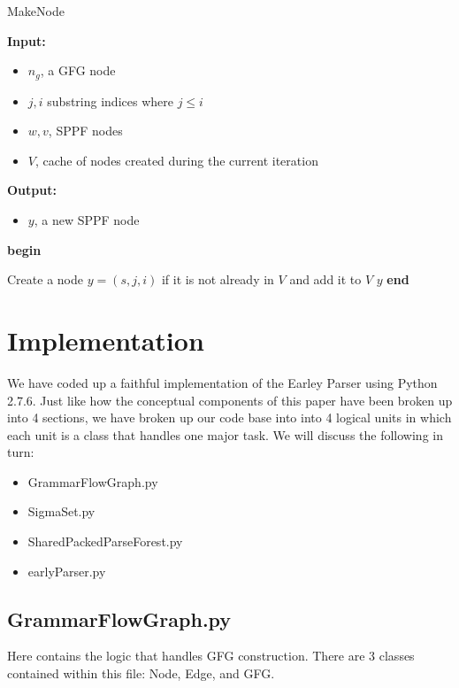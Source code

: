 \documentclass{sigplanconf}
\begin{document}
\begin{algorithm}[!h]\label{alg:MN}
	\caption{MakeNode}
	\textbf{Input:} 
	\begin{itemize}
	\item[] $n_g$, a GFG node
	\item[] $j,i$ substring indices where $j\leq{i}$
	\item[] $w,v$, SPPF nodes
	\item[] $V$, cache of nodes created during the current iteration
	\end{itemize}
	\textbf{Output:} 
	\begin{itemize}
	\item[] $y$, a new SPPF node
	\end{itemize}
	\textbf{begin}
	
	{
	Create a node $y=(s,j,i)$ if it is not already in $V$ and add it to $V$ \;
	}
	\Return $y$ \;
	\textbf{end}
\end{algorithm}

\section{Implementation}
We have coded up a faithful implementation of the Earley Parser using Python 2.7.6. Just like how the conceptual components of this paper have been broken up into 4 sections, we have broken up our code base into into 4 logical units in which each unit is a class that handles one major task. We will discuss the following in turn:
\begin{itemize}
\item GrammarFlowGraph.py
\item SigmaSet.py
\item SharedPackedParseForest.py
\item earlyParser.py
\end{itemize}

\subsection{GrammarFlowGraph.py}
Here contains the logic that handles GFG construction. There are 3 classes contained within this file: Node, Edge, and GFG. 
\end{document}
